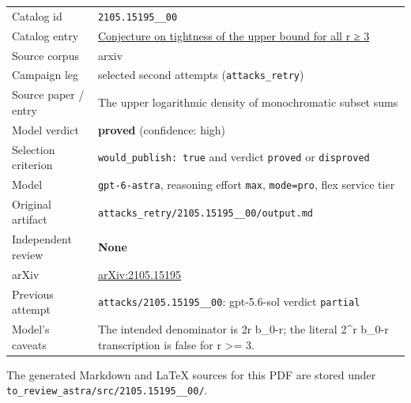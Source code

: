 \documentclass[
  11pt,
  a4paper,
]{article}
\newcounter{none} %
\begin{document}
{\def\LTcaptype{none} %
\begin{longtable}[]{@{}
  >{\raggedright\arraybackslash}p{}
  >{\raggedright\arraybackslash}p{}@{}}
\toprule\noalign{}
\endhead
\bottomrule\noalign{}
\endlastfoot
Catalog id & \texttt{2105.15195\_\_00} \\
Catalog entry &
\href{https://graph-theory-ai.github.io/graph-conjectures/arxiv/2105.15195__00/}{Conjecture
on tightness of the upper bound for all r ≥ 3} \\
Source corpus & arxiv \\
Campaign leg & selected second attempts (\texttt{attacks\_retry}) \\
Source paper / entry & The upper logarithmic density of monochromatic
subset sums \\
Model verdict & \textbf{proved} (confidence: high) \\
Selection criterion & \texttt{would\_publish:\ true} and verdict
\texttt{proved} or \texttt{disproved} \\
Model & \texttt{gpt-6-astra}, reasoning effort \texttt{max},
\texttt{mode=pro}, flex service tier \\
Original artifact &
\texttt{attacks\_retry/2105.15195\_\_00/output.md} \\
Independent review & \textbf{None} \\
arXiv & \href{https://arxiv.org/abs/2105.15195}{arXiv:2105.15195} \\
Previous attempt & \texttt{attacks/2105.15195\_\_00}: gpt-5.6-sol
verdict \texttt{partial} \\
Model's caveats & The intended denominator is 2r b\_0-r; the literal
2\^{}r b\_0-r transcription is false for r \textgreater= 3. \\
\end{longtable}
}

The generated Markdown and LaTeX sources for this PDF are stored under
\texttt{to\_review\_astra/src/2105.15195\_\_00/}.
\end{document}
